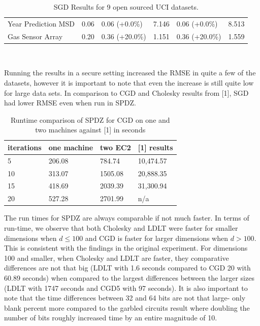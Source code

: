 \documentclass{article}
\theoremstyle{plain}
\theoremstyle{definition}
\theoremstyle{remark}
\begin{document}
\begin{table}[H]
\begin{tabular}{@{}llllll@{}}
Year Prediction MSD   & 0.06                              & 0.06 (+0.0\%)                                   & 7.146                                  & 0.06 (+0.0\%)                                   & 8.513                                  \\
Gas Sensor Array      & 0.20                              & 0.36 (+20.0\%)                                  & 1.151                                  & 0.36 (+20.0\%)                                  & 1.559                                  \\ \bottomrule
\end{tabular}\\
\caption{SGD Results for 9 open sourced UCI datasets.}
\end{table}

\noindent
Running the results in a secure setting increased the RMSE in quite a few of the datasets, however it is important to note that even the increase is still quite low for large data sets. In comparison to CGD and Cholesky results from [1], SGD had lower RMSE even when run in SPDZ. 

\begin{table}[H]
\centering
\label{my-label}
\begin{tabular}{@{}llll@{}}
\toprule
iterations & one machine      & two EC2      & {[}1{]} results    \\ \midrule
5     & 206.08 & 784.74  & 10,474.57 \\
10    & 313.07 & 1505.08 & 20,888.35 \\
15    & 418.69 & 2039.39 & 31,300.94 \\
20    & 527.28 & 2701.99 & n/a        \\ \bottomrule
\end{tabular}
\caption{Runtime comparison of SPDZ for CGD on one and two machines against [1] in seconds}
\end{table}

\noindent
The run times for SPDZ are always comparable if not much faster. In terms of run-time, we observe that both Cholesky and LDLT were faster for smaller dimensions when $d \leq 100$ and CGD is faster for larger dimensions when $d > 100$. This is consistent with the findings in the original experiment. For dimensions 100 and smaller, when Cholesky and LDLT are faster, they comparative differences are not that big (LDLT with 1.6 seconds compared to CGD 20 with 60.89 seconds) when compared to the largest differences between the larger sizes (LDLT with 1747 seconds and CGD5 with 97 seconds). It is also important to note that the time differences between 32 and 64 bits are not that large- only blank percent more compared to the garbled circuits result where doubling the number of bits roughly increased time by an entire magnitude of 10.  \\
\end{document}
